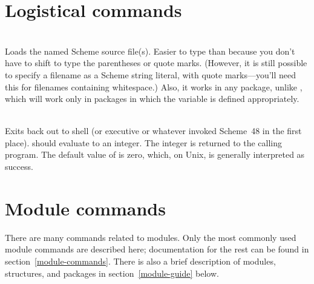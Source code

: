 \section{Logistical commands}
\begin{description}
\item {}\\
    Loads the named Scheme source file(s).
    Easier to type than  because you don't have to
    shift to type the parentheses or quote marks.  
    (However, it is still possible to specify a filename as a Scheme
    string literal, with quote marks---you'll need this for filenames
    containing whitespace.)
    Also, it works in
    any package, unlike , which will work only
    in packages in which the variable  is defined appropriately.

\item {}\\
    Exits back out to shell (or executive or whatever invoked Scheme~48
    in the first place).
     should evaluate to an integer.  The
    integer is returned to the calling program.
    The default value of  is zero, which, on Unix,
    is generally interpreted as success.
\end{description}

\section{Module commands}
\label{module-command-guide}

There are many commands related to modules.
Only the most commonly used module commands are described here;
 documentation for the
 rest can be found in section~\ref{module-commands}.
There is also
a brief description of modules, structures, and packages in section~\ref{module-guide} below.

